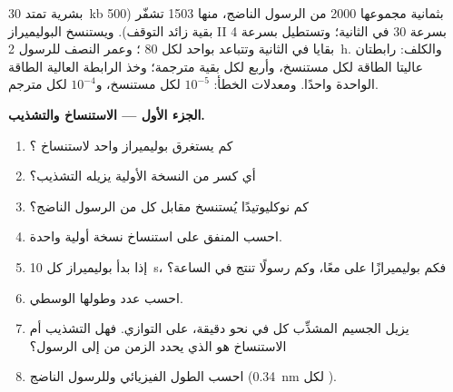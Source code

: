 \begin{problem}
\label{pb:b1:gene-expression:1}
 بشرية تمتد \qty{30}{kb} بثمانية  مجموعها
\qty{2000}{}  من الرسول الناضج، منها \qty{1503}{} تشفّر
(500 بقية زائد التوقف). ويستنسخ البوليميراز II بسرعة \qty{30}{}
 في الثانية؛ وتستطيل  بسرعة \qty{4}{} بقايا في
الثانية وتتباعد بواحد لكل \qty{80}{} ؛ وعمر النصف للرسول
\qty{2}{h}. والكلف: رابطتان عاليتا الطاقة لكل  مستنسخ،
وأربع لكل بقية مترجمة؛ وخذ الرابطة العالية الطاقة الواحدة 
واحدًا. ومعدلات الخطأ: $10^{-5}$ لكل  مستنسخ، و$10^{-4}$
لكل  مترجم.

\medskip
\noindent\textbf{الجزء الأول --- الاستنساخ والتشذيب.}
\begin{enumerate}
  \item كم يستغرق بوليميراز واحد لاستنساخ ؟
  \item أي كسر من النسخة الأولية يزيله التشذيب؟
  \item كم نوكليوتيدًا يُستنسخ مقابل كل  من الرسول
        الناضج؟
  \item احسب  المنفق على استنساخ نسخة أولية واحدة.
  \item إذا بدأ بوليميراز كل \qty{10}{s}، فكم بوليميرازًا على
         معًا، وكم رسولًا تنتج  في الساعة؟
  \item احسب عدد  وطولها الوسطي.
  \item يزيل الجسيم المشذِّب كل  في نحو دقيقة، على التوازي.
        فهل التشذيب أم الاستنساخ هو الذي يحدد الزمن من  إلى
        الرسول؟
  \item احسب الطول الفيزيائي  وللرسول الناضج
        (\qty{0.34}{nm} لكل ).
\end{enumerate}


\end{problem}
